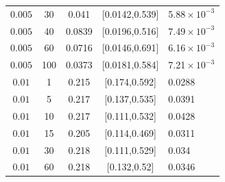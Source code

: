\documentclass[fontset=windows,11pt]{ctexart}
\numberwithin{equation}{section}
\begin{document}
\begin{longtable}{ccccl}
$0.005$ & 30 & 0.041 & [0.0142,0.539] & 5.88$\!\times\!10^{-3}$ \\
$0.005$ & 40 & 0.0839 & [0.0196,0.516] & 7.49$\!\times\!10^{-3}$ \\
$0.005$ & 60 & 0.0716 & [0.0146,0.691] & 6.16$\!\times\!10^{-3}$ \\
$0.005$ & 100 & 0.0373 & [0.0181,0.584] & 7.21$\!\times\!10^{-3}$ \\
$0.01$ & 1 & 0.215 & [0.174,0.592] & 0.0288 \\
$0.01$ & 5 & 0.217 & [0.137,0.535] & 0.0391 \\
$0.01$ & 10 & 0.217 & [0.111,0.532] & 0.0428 \\
$0.01$ & 15 & 0.205 & [0.114,0.469] & 0.0311 \\
$0.01$ & 30 & 0.218 & [0.111,0.529] & 0.034 \\
$0.01$ & 60 & 0.218 & [0.132,0.52] & 0.0346\\\bottomrule
\end{longtable}
\end{document}
